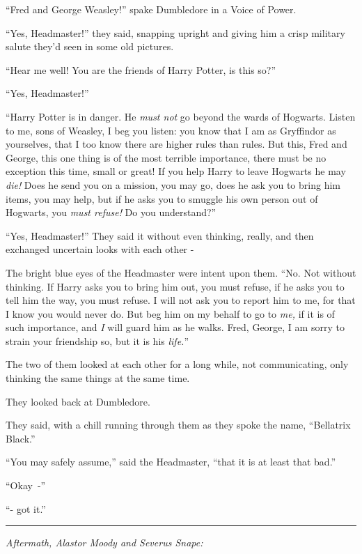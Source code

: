 ``Fred and George Weasley!'' spake Dumbledore in a Voice of Power.

``Yes, Headmaster!'' they said, snapping upright and giving him a crisp military salute they'd seen in some old pictures.

``Hear me well! You are the friends of Harry Potter, is this so?''

``Yes, Headmaster!''

``Harry Potter is in danger. He \emph{must not} go beyond the wards of Hogwarts. Listen to me, sons of Weasley, I beg you listen: you know that I am as Gryffindor as yourselves, that I too know there are higher rules than rules. But this, Fred and George, this one thing is of the most terrible importance, there must be no exception this time, small or great! If you help Harry to leave Hogwarts he may \emph{die!} Does he send you on a mission, you may go, does he ask you to bring him items, you may help, but if he asks you to smuggle his own person out of Hogwarts, you \emph{must refuse!} Do you understand?''

``Yes, Headmaster!'' They said it without even thinking, really, and then exchanged uncertain looks with each other -

The bright blue eyes of the Headmaster were intent upon them. ``No. Not without thinking. If Harry asks you to bring him out, you must refuse, if he asks you to tell him the way, you must refuse. I will not ask you to report him to me, for that I know you would never do. But beg him on my behalf to go to \emph{me,} if it is of such importance, and \emph{I} will guard him as he walks. Fred, George, I am sorry to strain your friendship so, but it is his \emph{life.}''

The two of them looked at each other for a long while, not communicating, only thinking the same things at the same time.

They looked back at Dumbledore.

They said, with a chill running through them as they spoke the name, ``Bellatrix Black.''

``You may safely assume,'' said the Headmaster, ``that it is at least that bad.''

``Okay~-''

``- got it.''

\begin{center}\rule{3in}{0.4pt}\end{center}

\emph{Aftermath, Alastor Moody and Severus Snape:}

